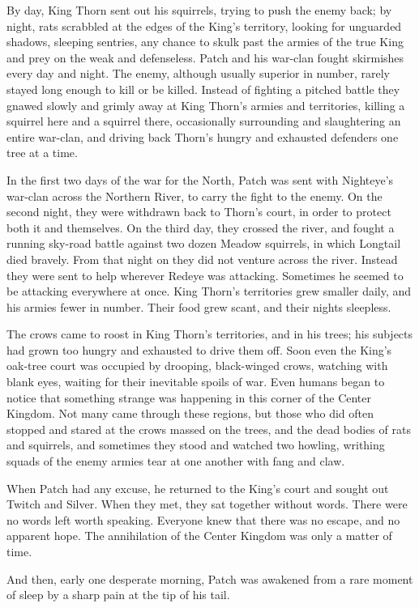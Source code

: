 \documentclass[12pt]{memoir}
\begin{document}
By day, King Thorn sent out his squirrels, trying to push the enemy
back; by night, rats scrabbled at the edges of the King’s territory,
looking for unguarded shadows, sleeping sentries, any chance to skulk
past the armies of the true King and prey on the weak and
defenseless. Patch and his war-clan fought skirmishes every day and
night. The enemy, although usually superior in number, rarely stayed
long enough to kill or be killed. Instead of fighting a pitched battle
they gnawed slowly and grimly away at King Thorn’s armies and
territories, killing a squirrel here and a squirrel there,
occasionally surrounding and slaughtering an entire war-clan, and
driving back Thorn’s hungry and exhausted defenders one tree at a
time.

In the first two days of the war for the North, Patch was sent with
Nighteye’s war-clan across the Northern River, to carry the fight to
the enemy. On the second night, they were withdrawn back to Thorn’s
court, in order to protect both it and themselves. On the third day,
they crossed the river, and fought a running sky-road battle against
two dozen Meadow squirrels, in which Longtail died bravely. From that
night on they did not venture across the river. Instead they were sent
to help wherever Redeye was attacking. Sometimes he seemed to be
attacking everywhere at once. King Thorn’s territories grew smaller
daily, and his armies fewer in number. Their food grew scant, and
their nights sleepless.

The crows came to roost in King Thorn’s territories, and in his trees;
his subjects had grown too hungry and exhausted to drive them
off. Soon even the King’s oak-tree court was occupied by drooping,
black-winged crows, watching with blank eyes, waiting for their
inevitable spoils of war. Even humans began to notice that something
strange was happening in this corner of the Center Kingdom. Not many
came through these regions, but those who did often stopped and stared
at the crows massed on the trees, and the dead bodies of rats and
squirrels, and sometimes they stood and watched two howling, writhing
squads of the enemy armies tear at one another with fang and claw.

When Patch had any excuse, he returned to the King’s court and sought
out Twitch and Silver. When they met, they sat together without
words. There were no words left worth speaking. Everyone knew that
there was no escape, and no apparent hope. The annihilation of the
Center Kingdom was only a matter of time.

And then, early one desperate morning, Patch was awakened from a rare
moment of sleep by a sharp pain at the tip of his tail.
\end{document}

